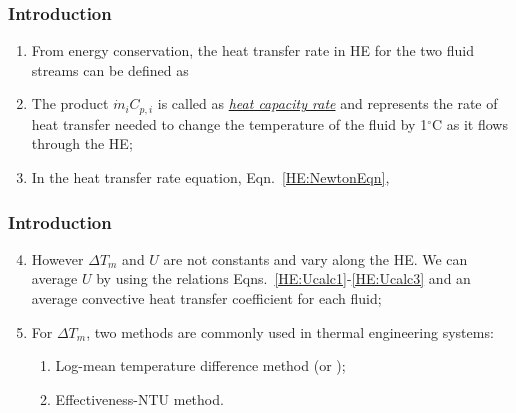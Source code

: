 \documentclass[10pt,compress,unknownkeysallowed]{beamer}
\begin{document}
\begin{frame}
  \frametitle{Introduction}
     \begin{enumerate}%
          \item<1-> From energy conservation, the heat transfer rate in HE for the two fluid streams can be defined as
          \item<2-> The product $\dot{m}_{i}C_{p,i}$ is called as \underline{\it heat capacity rate} and represents the rate of heat transfer needed to change the temperature of the fluid by 1$^{\circ}$C as it flows through the HE;
          \item<2-> In the heat transfer rate equation, Eqn.~\ref{HE:NewtonEqn},
     \end{enumerate}

\end{frame}

\begin{frame}
  \frametitle{Introduction}
     \begin{enumerate}\setcounter{enumi}{3}
          \item<1-> However $\Delta T_{m}$ and $U$ are not constants and vary along the HE. We can average $U$ by using the relations Eqns.~\ref{HE:Ucalc1}-\ref{HE:Ucalc3} and an average convective heat transfer coefficient for each fluid;
          \item<2-> For $\Delta T_{m}$, two methods are commonly used in thermal engineering systems:
             \begin{enumerate}
                \item<2-> Log-mean temperature difference method (or );
                \item<2-> Effectiveness-NTU method.
             \end{enumerate}
     \end{enumerate}

\end{frame}
\end{document}
